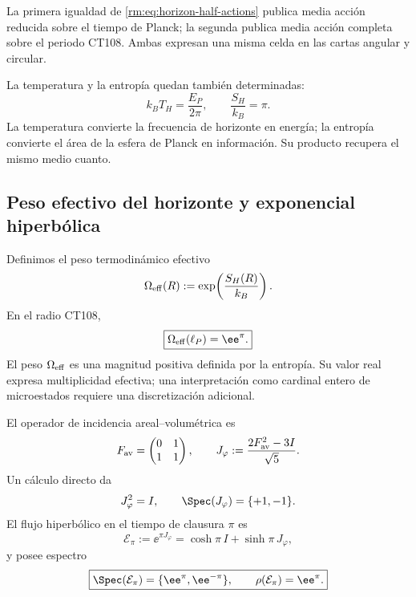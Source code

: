 La primera igualdad de \cref{rm:eq:horizon-half-actions} publica media acci\'on
reducida sobre el tiempo de Planck; la segunda publica media acci\'on completa
sobre el periodo CT108. Ambas expresan una misma celda en las cartas angular
y circular.

La temperatura y la entrop\'ia quedan tambi\'en determinadas:
\begin{equation}
 k_BT_H=\frac{E_P}{2\pi},
 \qquad
 \boxed{\frac{S_H}{k_B}=\pi.}
 \label{rm:eq:horizon-CT108-TS}
\end{equation}
La temperatura convierte la frecuencia de horizonte en energ\'ia; la
entrop\'ia convierte el \'area de la esfera de Planck en informaci\'on. Su
producto recupera el mismo medio cuanto.

\subsection{Peso efectivo del horizonte y exponencial hiperb\'olica}

Definimos el peso termodin\'amico efectivo
\begin{equation}
 \Omega_{\rm eff}(R):=\exp\!\left(\frac{S_H(R)}{k_B}\right).
 \label{rm:eq:horizon-effective-weight}
\end{equation}
En el radio CT108,
\begin{equation}
 \boxed{\Omega_{\rm eff}(\ell_P)=\ee^\pi.}
 \label{rm:eq:horizon-effective-e-pi}
\end{equation}
El peso \(\Omega_{\rm eff}\) es una magnitud positiva definida por la
entrop\'ia. Su valor real expresa multiplicidad efectiva; una interpretaci\'on
como cardinal entero de microestados requiere una discretizaci\'on adicional.

El operador de incidencia areal--volum\'etrica es
\begin{equation}
 F_{\rm av}=\begin{pmatrix}0&1\\1&1\end{pmatrix},
 \qquad
 J_\varphi:=\frac{2F_{\rm av}^2-3I}{\sqrt5}.
 \label{rm:eq:horizon-J-phi}
\end{equation}
Un c\'alculo directo da
\begin{equation}
 J_\varphi^2=I,
 \qquad
 \Spec(J_\varphi)=\{+1,-1\}.
 \label{rm:eq:horizon-J-involution}
\end{equation}
El flujo hiperb\'olico en el tiempo de clausura \(\pi\) es
\begin{equation}
 \mathcal E_\pi
 :=\ee^{\pi J_\varphi}
 =\cosh\pi\,I+\sinh\pi\,J_\varphi,
 \label{rm:eq:horizon-hyperbolic-flow}
\end{equation}
y posee espectro
\begin{equation}
 \boxed{
 \Spec(\mathcal E_\pi)=\{\ee^\pi,\ee^{-\pi}\},
 \qquad
 \rho(\mathcal E_\pi)=\ee^\pi.}
 \label{rm:eq:horizon-hyperbolic-spectrum}
\end{equation}

